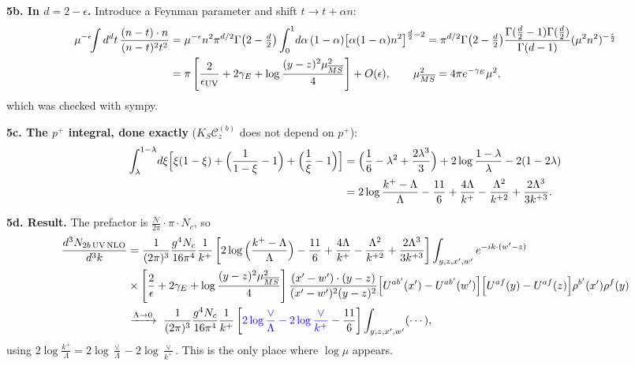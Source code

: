\documentclass[10pt]{article}
\numberwithin{equation}{section}
\begin{document}
\textbf{5b. In $d=2-\epsilon$.} Introduce a Feynman parameter and shift $t\to t+\alpha n$:
\begin{align}
\mu^{-\epsilon}\!\!\int d^{d}t\,\frac{(n-t)\cdot n}{(n-t)^{2}t^{2}}&=\mu^{-\epsilon}n^{2}\pi^{d/2}\Gamma\big(2-\tfrac d2\big)\int_{0}^{1}\!d\alpha\,(1-\alpha)\big[\alpha(1-\alpha)n^{2}\big]^{\frac d2-2}
=\pi^{d/2}\Gamma\big(2-\tfrac d2\big)\frac{\Gamma(\frac d2-1)\Gamma(\frac d2)}{\Gamma(d-1)}(\mu^{2}n^{2})^{-\frac\epsilon2}\notag\\
&=\pi\left[\frac{2}{\epsilon_{\rm UV}}+2\gamma_{E}+\log\frac{(y-z)^{2}\mu^{2}_{\overline{MS}}}{4}\right]+O(\epsilon),\qquad \mu^{2}_{\overline{MS}}=4\pi e^{-\gamma_{E}}\mu^{2},
\end{align}
which was checked with sympy.

\textbf{5c. The $p^{+}$ integral, done exactly} ($K_{S}\mathcal{C}^{(b)}_{z}$ does not depend on $p^{+}$):
\begin{align}
\int_{\lambda}^{1-\lambda}\!d\xi\Big[\xi(1-\xi)+\Big(\frac{1}{1-\xi}-1\Big)+\Big(\frac1\xi-1\Big)\Big]
&=\Big(\frac16-\lambda^{2}+\frac{2\lambda^{3}}{3}\Big)+2\log\frac{1-\lambda}{\lambda}-2(1-2\lambda)\notag\\
&=2\log\frac{k^{+}-\Lambda}{\Lambda}-\frac{11}{6}+\frac{4\Lambda}{k^{+}}-\frac{\Lambda^{2}}{k^{+2}}+\frac{2\Lambda^{3}}{3k^{+3}}.
\end{align}

\textbf{5d. Result.} The prefactor is $\frac{\mathcal{N}}{2\pi}\cdot\pi\cdot N_{c}$, so
\begin{align}
\frac{d^{3}N_{2b\,\rm UV\,NLO}}{d^{3}k}&=\frac{1}{(2\pi)^{3}}\frac{g^{4}N_{c}}{16\pi^{4}}\frac{1}{k^{+}}\left[2\log\Big(\frac{k^{+}-\Lambda}{\Lambda}\Big)-\frac{11}{6}+\frac{4\Lambda}{k^{+}}-\frac{\Lambda^{2}}{k^{+2}}+\frac{2\Lambda^{3}}{3k^{+3}}\right]\int_{y,z,x',w'}e^{-ik\cdot(w'-z)}\notag\\
&\times\left[\frac{2}{\epsilon}+2\gamma_{E}+\log\frac{(y-z)^{2}\mu^{2}_{\overline{MS}}}{4}\right]\frac{(x'-w')\cdot(y-z)}{(x'-w')^{2}(y-z)^{2}}\Big[U^{ab'}(x')-U^{ab'}(w')\Big]\Big[U^{af}(y)-U^{af}(z)\Big]\rho^{b'}(x')\rho^{f}(y)\notag\\
&\xrightarrow{\Lambda\to0}\ \frac{1}{(2\pi)^{3}}\frac{g^{4}N_{c}}{16\pi^{4}}\frac{1}{k^{+}}\left[{\color{blue}2\log\frac{\vee}{\Lambda}-2\log\frac{\vee}{k^{+}}}-\frac{11}{6}\right]\int_{y,z,x',w'}(\cdots),
\label{eq:UV}
\end{align}
using $2\log\frac{k^{+}}{\Lambda}=2\log\frac{\vee}{\Lambda}-2\log\frac{\vee}{k^{+}}$. This is the only place where $\log\mu$ appears.
\end{document}
